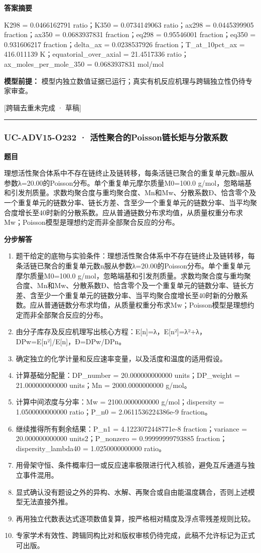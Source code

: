 \documentclass[UTF8,11pt,a4paper]{ctexart}
\begin{document}
\noindent\textbf{答案摘要}\par
K298 = 0.0466162791 ratio；K350 = 0.0734149063 ratio；ax298 = 0.0445399905 fraction；ax350 = 0.0683937831 fraction；eq298 = 0.95546001 fraction；eq350 = 0.931606217 fraction；delta\_ax = 0.0238537926 fraction；T\_at\_10pct\_ax = 416.011139 K；equatorial\_over\_axial = 21.4517336 ratio；ax\_moles\_per\_mole\_350 = 0.0683937831 mol/mol\par
\noindent\textbf{模型前提：}
模型内独立数值证据已运行；真实有机反应机理与跨辑独立性仍待专家审查。\par
\noindent\textcolor{red!65!black}{[跨辑去重未完成 · 草稿]} \par
\medskip\hrule\medskip
{}
\subsubsection*{UC-ADV15-O232 · 活性聚合的Poisson链长矩与分散系数}
\noindent\textbf{题目}\par
理想活性聚合体系中不存在链终止及链转移，每条活链已聚合的重复单元数n服从参数λ=20.00的Poisson分布。单个重复单元摩尔质量M0=100.0 g/mol，忽略端基和引发剂质量。求数均聚合度与重均聚合度、Mn和Mw、分散系数Đ、恰含零个及一个重复单元的链数分率、链长方差、含至少一个重复单元的链数分率、当平均聚合度增长至40时新的分散系数。应从普通链数分布求均值，从质量权重分布求Mw；Poisson模型是理想约定而非全部聚合反应的分布。\par
\medskip\noindent\textbf{分步解答}
\begin{enumerate}
\item 题干给定的底物与实验条件：理想活性聚合体系中不存在链终止及链转移，每条活链已聚合的重复单元数n服从参数λ=20.00的Poisson分布。单个重复单元摩尔质量M0=100.0 g/mol，忽略端基和引发剂质量。求数均聚合度与重均聚合度、Mn和Mw、分散系数Đ、恰含零个及一个重复单元的链数分率、链长方差、含至少一个重复单元的链数分率、当平均聚合度增长至40时新的分散系数。应从普通链数分布求均值，从质量权重分布求Mw；Poisson模型是理想约定而非全部聚合反应的分布。
\item 由分子库存及反应机理写出核心方程：E[n]=λ，E[n²]=λ²+λ，DPw=E[n²]/E[n]，Đ=DPw/DPn。
\item 确定独立的化学计量和反应速率变量，以及活度和温度的适用假设。
\item 计算基础分配量：DP\_number = 20.000000000000 units；DP\_weight = 21.000000000000 units；Mn = 2000.0000000000 g/mol。
\item 计算中间浓度与分率：Mw = 2100.0000000000 g/mol；dispersity = 1.0500000000000 ratio；P\_n0 = 2.0611536224386e-9 fraction。
\item 继续推得所有剩余结果：P\_n1 = 4.1223072448771e-8 fraction；variance = 20.000000000000 units2；P\_nonzero = 0.99999999793885 fraction；dispersity\_lambda40 = 1.0250000000000 ratio。
\item 用骨架守恒、条件概率归一或反应速率极限进行代入核验，避免互斥通道与独立事件混用。
\item 显式确认没有题设之外的异构、水解、再聚合或自由能温度耦合，否则上述模型无法直接外推。
\item 再用独立代数表达式逐项数值复算，按严格相对精度及浮点零残差规则比较。
\item 专家学术有效性、跨辑同构比对和版权审核仍待完成，此稿不允许标记为正式可出版。
\end{enumerate}
\end{document}
